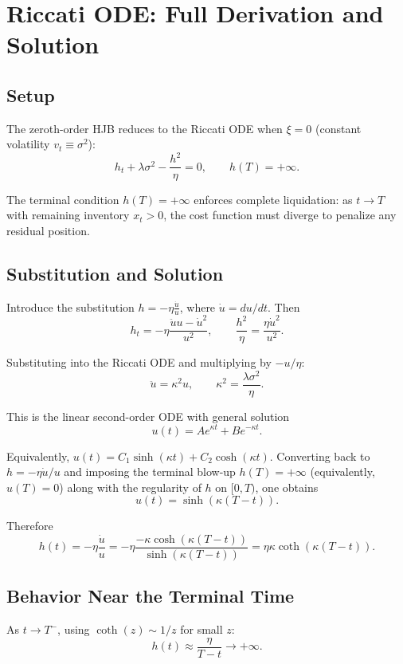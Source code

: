 \documentclass[11pt]{article}
\begin{document}
\section{Riccati ODE: Full Derivation and Solution}
\label{app:riccati}

\subsection{Setup}

The zeroth-order HJB reduces to the Riccati ODE when $\xi = 0$ (constant volatility $v_t \equiv \sigma^2$):
\[
h_t + \lambda\sigma^2 - \frac{h^2}{\eta} = 0, \qquad h(T) = +\infty.
\]

The terminal condition $h(T) = +\infty$ enforces complete liquidation: as $t \to T$ with remaining inventory $x_t > 0$, the cost function must diverge to penalize any residual position.

\subsection{Substitution and Solution}

Introduce the substitution $h = -\eta \frac{\dot{u}}{u}$, where $\dot{u} = du/dt$. Then
\[
h_t = -\eta\frac{\ddot{u}u - \dot{u}^2}{u^2}, \qquad \frac{h^2}{\eta} = \frac{\eta\dot{u}^2}{u^2}.
\]

Substituting into the Riccati ODE and multiplying by $-u/\eta$:
\[
\ddot{u} = \kappa^2 u, \qquad \kappa^2 = \frac{\lambda\sigma^2}{\eta}.
\]

This is the linear second-order ODE with general solution
\[
u(t) = A e^{\kappa t} + B e^{-\kappa t}.
\]

Equivalently, $u(t) = C_1\sinh(\kappa t) + C_2\cosh(\kappa t)$. Converting back to $h = -\eta\dot{u}/u$ and imposing the terminal blow-up $h(T) = +\infty$ (equivalently, $u(T) = 0$) along with the regularity of $h$ on $[0, T)$, one obtains
\[
u(t) = \sinh(\kappa(T-t)).
\]

Therefore
\[
h(t)
= -\eta\frac{\dot{u}}{u}
= -\eta\frac{-\kappa\cosh(\kappa(T-t))}{\sinh(\kappa(T-t))}
= \eta\kappa\coth(\kappa(T-t)).
\]

\subsection{Behavior Near the Terminal Time}

As $t \to T^-$, using $\coth(z) \sim 1/z$ for small $z$:
\[
h(t) \approx \frac{\eta}{T-t} \to +\infty.
\]
\end{document}
